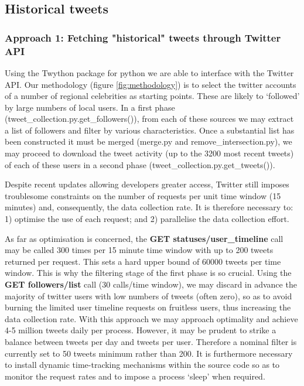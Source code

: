 \subsection*{Historical tweets}

\subsubsection*{Approach 1: Fetching "historical" tweets through Twitter API}

Using the Twython package for python we are able to interface with the Twitter API. Our methodology (figure \ref{fig:methodology}) is to select the twitter accounts of a number of regional celebrities as starting points. These are likely to `followed' by large numbers of local users. In a first phase (tweet\_collection.py.get\_followers()), from each of these sources we may extract a list of followers and filter by various characteristics. Once a substantial list has been constructed it must be merged (merge.py and remove\_intersection.py), we may proceed to download the tweet activity (up to the 3200 most recent tweets) of each of these users in a second phase (tweet\_collection.py.get\_tweets()).

Despite recent updates allowing developers greater access, Twitter still imposes troublesome constraints on the number of requests per unit time window (15 minutes) and, consequently, the data collection rate. It is therefore necessary to: 1) optimise the use of each request; and 2) parallelise the data collection effort.

As far as optimisation is concerned, the \textbf{GET statuses/user\_timeline} call may be called 300 times per 15 minute time window with up to 200 tweets returned per request. This sets a hard upper bound of 60000 tweets per time window. This is why the filtering stage of the first phase is so crucial. Using the \textbf{GET followers/list} call (30 calls/time window), we may discard in advance the majority of twitter users with low numbers of tweets (often zero), so as to avoid burning the limited user timeline requests on fruitless users, thus increasing the data collection rate. With this approach we may approach optimality and achieve 4-5 million tweets daily per process. However, it may be prudent to strike a balance between tweets per day and tweets per user. Therefore a nominal filter is currently set to 50 tweets minimum rather than 200. It is furthermore necessary to install dynamic time-tracking mechanisms within the source code so as to monitor the request rates and to impose a process `sleep' when required.

